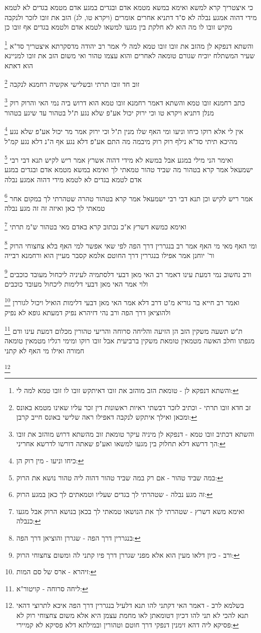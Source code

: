 \documentclass[12pt, openany]{book}
\newcommand{\footnotecomment}[1]{
	\renewcommand\thefootnote{}
	\footnote{#1}}
\newcommand{\commenta}[1]{\footnotecomment{#1}}
\begin{document}
{{כי איצטריך קרא למשא ואימא במשא מטמא אדם ובגדים במגע אדם מטמא בגדים לא לטמא מידי דהוה אמגע נבלה 
לא ס"ד דתניא אחרים אומרים (ויקרא טו, לג) הזב את זובו לזכר ולנקבה מקיש זובו לו מה הוא לא חלקת בין מגעו למשאו לטמא אדם ולטמא בגדים אף זובו כן 
\commenta{והשתא דנפקא לן - טומאת הזב מוהזב את זובו דאיתקש זובו לו זובו טמא למה לי:}
והשתא דנפקא לן מהזב את זובו זובו טמא למה לי 
אמר רב יהודה מדסקרתא איצטריך סד"א שעיר המשתלח יוכיח שגורם טומאה לאחרים והוא עצמו טהור ואי משום הזב את זובו למניינא הוא דאתא 
\commenta{זב חדא זובו תרתי - וכתיב לזכר דבשתי ראיות ראשונות דין זכר עליו שאינו מטמא באונס ומכאן ואילך איתקש לנקבה דאפילו ראה שלישי באונס חייב קרבן:}
זוב חד זובו תרתי ובשלישי אקשיה רחמנא לנקבה 
\commenta{והשתא דכתיב זובו טמא - דנפקא לן מיניה עיקר טומאת זוב מהשתא דרוש מוהזב את זובו הך דרשא דלא תחלוק בין מגעו למשאו ואע"פ שאתה דורשו לדרשא אחריני:}
כתב רחמנא זובו טמא והשתא דאמר רחמנא זובו טמא הוא דרוש ביה נמי האי
והרוק רוק מנלן דתניא {ויקרא טו } וכי ירוק יכול אע"פ שלא נגע ת"ל בטהור עד שיגע בטהור 
\commenta{כיחו וניעו - מין רוק הן:}
אין לי אלא רוקו כיחו וניעו ומי האף שלו מנין ת"ל וכי ירוק 
אמר מר יכול אע"פ שלא נגע מהיכא תיתי 
סד"א נילף רוק רוק מיבמה מה התם אע"פ דלא נגע אף ה"נ דלא נגע קמ"ל 
\commenta{במה שביד טהור - אם רק במה שביד טהור דהוה ליה טהור נושא את הרוק:}
ואימר הני מילי במגע אבל במשא לא מידי דהוה אשרץ אמר ריש לקיש תנא דבי רבי ישמעאל אמר קרא בטהור מה שביד טהור טמאתי לך 
ואימא במשא מטמא אדם ובגדים במגע אדם לטמא בגדים לא לטמא מידי דהוה אמגע נבלה 
\commenta{זה מגע נבלה - שטהרתי לך בגדים שעליו וטמאתים לך כאן במגע הרוק:}
אמר ריש לקיש וכן תנא דבי רבי ישמעאל אמר קרא בטהור טהרה שטהרתי לך במקום אחר טמאתי לך כאן ואיזה זה זה מגע נבלה 
\commenta{ואימא משא דשרץ - שטהרתי לך את הנושאו טמאתי לך בכאן בנושא הרוק אבל מגעו כנבלה:}
ואימא כמשא דשרץ א"כ נכתוב קרא באדם מאי בטהור ש"מ תרתי
\commenta{בנגררין דרך הפה - שגררן והוציאן דרך הפה:}
ומי האף מאי מי האף אמר רב בנגררין דרך הפה לפי שאי אפשר למי האף בלא צחצוחי הרוק ור' יוחנן אמר אפילו בנגררין דרך החוטם אלמא קסבר מעיין הוא ורחמנא רבייה 
\commenta{ורב - כיון דלאו מעין הוא אלא מפני שגררן דרך פיו קתני לה ומשום צחצוחי הרוק:}
ורב נחשוב נמי דמעת עינו דאמר רב האי מאן דבעי דלסתמיה לעיניה ליכחול מעובד כוכבים ולוי אמר האי מאן דבעי דלימות ליכחול מעובד כוכבים 
\commenta{זיהרא - ארס של סם המות:}
ואמר רב חייא בר גוריא מ"ט דרב דלא אמר האי מאן דבעי דלימות הואיל ויכול לגוררן ולהוציאן דרך הפה ורב נהי דזיהרא נפיק דמעתא גופא לא נפיק 
\commenta{ליחה סרוחה - קויטור"א:}
ת"ש תשעה משקין הזב הן הזיעה והליחה סרוחה והריעי טהורין מכלום דמעת עינו ודם מגפתו וחלב האשה מטמאין טומאת משקין ברביעית אבל זובו רוקו ומימי רגליו מטמאין טומאה חמורה ואילו מי האף לא קתני 
\commenta{בשלמא לרב - דאמר האי דקתני להו תנא דלעיל בנגררין דרך הפה איכא לתרוצי דהאי תנא להכי לא תני להו דכיון דטומאתן לאו מחמת עצמן היא אלא משום צחצוחי רוק לא פסיקא ליה דהא זימנין דנפקי דרך חוטם וטהורין ובמילתא דלא פסיקא לא קמיירי:}
}}
\end{document}
